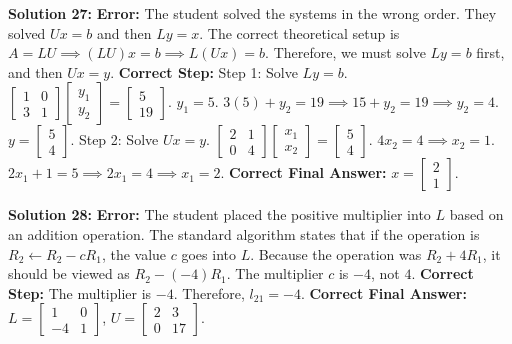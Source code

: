 \documentclass[11pt]{article}
\begin{document}
\textbf{Solution 27:}
\textbf{Error:} The student solved the systems in the wrong order. They solved $Ux = b$ and then $Ly = x$. The correct theoretical setup is $A = LU \implies (LU)x = b \implies L(Ux) = b$. Therefore, we must solve $Ly = b$ first, and then $Ux = y$.
\textbf{Correct Step:}
Step 1: Solve $Ly = b$.
$\begin{bmatrix} 1 & 0 \\ 3 & 1 \end{bmatrix} \begin{bmatrix} y_1 \\ y_2 \end{bmatrix} = \begin{bmatrix} 5 \\ 19 \end{bmatrix}$.
$y_1 = 5$. $3(5) + y_2 = 19 \implies 15 + y_2 = 19 \implies y_2 = 4$. $y = \begin{bmatrix} 5 \\ 4 \end{bmatrix}$.
Step 2: Solve $Ux = y$.
$\begin{bmatrix} 2 & 1 \\ 0 & 4 \end{bmatrix} \begin{bmatrix} x_1 \\ x_2 \end{bmatrix} = \begin{bmatrix} 5 \\ 4 \end{bmatrix}$.
$4x_2 = 4 \implies x_2 = 1$. $2x_1 + 1 = 5 \implies 2x_1 = 4 \implies x_1 = 2$.
\textbf{Correct Final Answer:} $x = \begin{bmatrix} 2 \\ 1 \end{bmatrix}$.

\vspace{0.5cm}
\textbf{Solution 28:}
\textbf{Error:} The student placed the positive multiplier into $L$ based on an addition operation. The standard algorithm states that if the operation is $R_2 \leftarrow R_2 - cR_1$, the value $c$ goes into $L$. Because the operation was $R_2 + 4R_1$, it should be viewed as $R_2 - (-4)R_1$. The multiplier $c$ is $-4$, not $4$.
\textbf{Correct Step:} The multiplier is $-4$. Therefore, $l_{21} = -4$.
\textbf{Correct Final Answer:} $L = \begin{bmatrix} 1 & 0 \\ -4 & 1 \end{bmatrix}$, $U = \begin{bmatrix} 2 & 3 \\ 0 & 17 \end{bmatrix}$.
\end{document}
